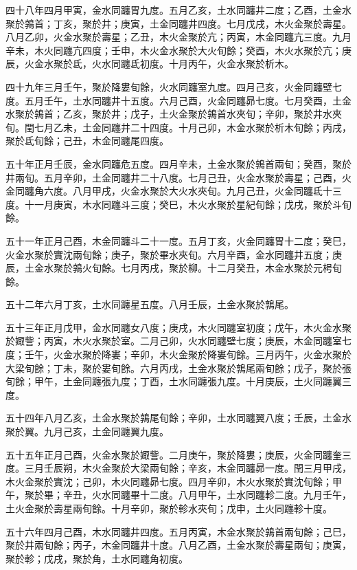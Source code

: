 \begin{pinyinscope}
四十八年四月甲寅，金水同躔胃九度。五月乙亥，土水同躔井二度；乙酉，土金水聚於鶉首；丁亥，聚於井；庚寅，土金同躔井四度。七月戊戌，木火金聚於壽星。八月乙卯，火金水聚於壽星；乙丑，木火金聚於亢；丙寅，木金同躔亢三度。九月辛未，木火同躔亢四度；壬申，木火金水聚於大火旬餘；癸酉，木火水聚於亢；庚辰，火金水聚於氐，火水同躔氐初度。十月丙午，火金水聚於析木。

四十九年三月壬午，聚於降婁旬餘，火水同躔室九度。四月己亥，火金同躔壁七度。五月壬午，土水同躔井十五度。六月己酉，火金同躔昴七度。七月癸酉，土金水聚於鶉首；乙亥，聚於井；戊子，土火金聚於鶉首水夾旬；辛卯，聚於井水夾旬。閏七月乙未，土金同躔井二十四度。十月己卯，木金水聚於析木旬餘；丙戌，聚於氐旬餘；己丑，木金同躔尾四度。

五十年正月壬辰，金水同躔危五度。四月辛未，土金水聚於鶉首兩旬；癸酉，聚於井兩旬。五月辛卯，土金同躔井二十八度。七月己丑，火金水聚於壽星；己酉，火金同躔角六度。八月甲戌，火金水聚於大火水夾旬。九月己丑，火金同躔氐十三度。十一月庚寅，木水同躔斗三度；癸巳，木火水聚於星紀旬餘；戊戌，聚於斗旬餘。

五十一年正月己酉，木金同躔斗二十一度。五月丁亥，火金同躔胃十二度；癸巳，火金水聚於實沈兩旬餘；庚子，聚於畢水夾旬。六月辛酉，金水同躔井五度；庚辰，土金水聚於鶉火旬餘。七月丙戌，聚於柳。十二月癸丑，木金水聚於元枵旬餘。

五十二年六月丁亥，土水同躔星五度。八月壬辰，土金水聚於鶉尾。

五十三年正月戊甲，金水同躔女八度；庚戌，木火同躔室初度；戊午，木火金水聚於娵訾；丙寅，木火水聚於室。二月己卯，火水同躔壁七度；庚辰，木金同躔室七度；壬午，火金水聚於降婁；辛卯，木火金聚於降婁旬餘。三月丙午，火金水聚於大梁旬餘；丁未，聚於婁旬餘。六月丙戌，土金水聚於鶉尾兩旬餘；戊子，聚於張旬餘；甲午，土金同躔張九度；丁酉，土水同躔張九度。十月庚辰，土火同躔翼三度。

五十四年八月乙亥，土金水聚於鶉尾旬餘；辛卯，土水同躔翼八度；壬辰，土金水聚於翼。九月己亥，土金同躔翼九度。

五十五年正月己酉，火金水聚於娵訾。二月庚午，聚於降婁；庚辰，火金同躔奎三度。三月壬辰朔，木火金聚於大梁兩旬餘；辛亥，木金同躔昴一度。閏三月甲戌，木火金聚於實沈；己卯，木火同躔昴七度。四月辛卯，木火水聚於實沈旬餘；甲午，聚於畢；辛丑，火水同躔畢十二度。八月甲午，土水同躔軫二度。九月壬午，土火金聚於壽星兩旬餘。十月辛卯，聚於軫水夾旬；戊申，土火同躔軫十度。

五十六年四月己酉，木水同躔井四度。五月丙寅，木金水聚於鶉首兩旬餘；己巳，聚於井兩旬餘；丙子，木金同躔井十度。八月乙酉，土金水聚於壽星兩旬；庚寅，聚於軫；戊戌，聚於角，土水同躔角初度。


\end{pinyinscope}
